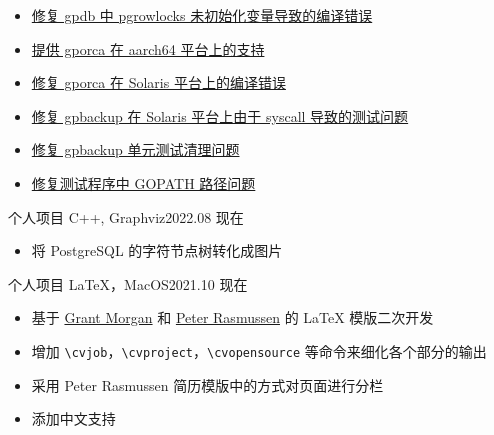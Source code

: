 \documentclass[10pt,a4paper]{xresume}
\begin{document}
\begin{itemize}
\item \href{https://github.com/greenplum-db/gpdb/commit/75283bc70e9783f9197cd141464941f5bbf09967}{修复 gpdb 中 pgrowlocks 未初始化变量导致的编译错误}
\item \href{https://github.com/greenplum-db/gporca/commit/6258ef0743ef685d9f8fc529a629fb92eb512289}{提供 gporca 在 aarch64 平台上的支持}
\item \href{https://github.com/greenplum-db/gporca/commit/54ce8b3c0de2c63a5ea8eee8c2ce5d513214eba7}{修复 gporca 在 Solaris 平台上的编译错误}
\item \href{https://github.com/greenplum-db/gpbackup/commit/e28df4dfcf6f208134c8be69c22258220c333471}{修复 gpbackup 在 Solaris 平台上由于 syscall 导致的测试问题}
\item \href{https://github.com/greenplum-db/gpbackup/commit/fa25bf640e3ad80f2d2be3aca775bf238c627d8f}{修复 gpbackup 单元测试清理问题}
\item \href{https://github.com/greenplum-db/gpbackup/commit/2843de46e509b8485ce11095d73d7ea7964ed390}{修复测试程序中 GOPATH 路径问题}
\end{itemize}


          {个人项目}
          {C++, Graphviz}{2022.08 \textendash{} 现在}
\begin{itemize}
\item 将 PostgreSQL 的字符节点树转化成图片
\end{itemize}

\divider{}

          {个人项目}
          {\LaTeX{}，MacOS}{2021.10 \textendash{} 现在}
\begin{itemize}
\item 基于 \href{https://www.overleaf.com/articles/grant-morgans-first-latex-resume/jtdbtcctgnrr}{Grant Morgan} 和 \href{https://www.overleaf.com/articles/peter-rasmussens-resume-data-scientist/bphkfprrcnwv}{Peter Rasmussen} 的 \LaTeX{} 模版二次开发
\item 增加 \verb|\cvjob|，\verb|\cvproject|，\verb|\cvopensource| 等命令来细化各个部分的输出
\item 采用 Peter Rasmussen 简历模版中的方式对页面进行分栏
\item 添加中文支持
\end{itemize}
\end{document}
